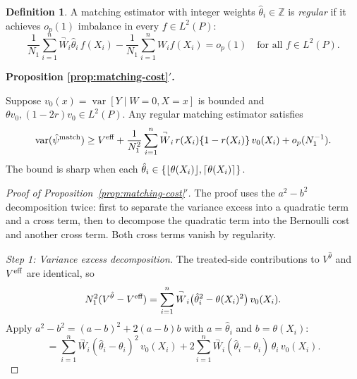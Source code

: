 \documentclass{article}
\newcommand{\paragraph}[1]{\par\noindent\textit{#1}\enspace}
\newenvironment{propositionprime}[1]{%
  \par\medskip\noindent\textbf{Proposition #1$'$.}\itshape\space
}{%
  \par\medskip
}
\theoremstyle{definition}
\newtheorem{definition}{Definition}
\DeclareMathOperator{\Var}{var}
\DeclarePairedDelimiter\floor{\lfloor}{\rfloor}
\DeclarePairedDelimiter\ceil{\lceil}{\rceil}
\newcommand{\<}{\langle}
\renewcommand{\>}{\rangle}
\begin{document}
\begin{refsection}
\begin{definition}
\label{def:regular-matching}
A matching estimator with integer weights $\hat\theta_i \in \mathbb{Z}$ is \emph{regular} if it achieves $o_p(1)$ imbalance in every $f \in L^2(P)$:
\[
\frac{1}{N_1}\sum_{i=1}^n \overset{\neg}{W}_i \hat\theta_i\,f(X_i) - \frac{1}{N_1}\sum_{i=1}^n W_i f(X_i) = o_p(1) \quad \text{for all } f \in L^2(P).
\]
\end{definition}

\begin{propositionprime}{\ref{prop:matching-cost}}
Suppose $v_0(x) = \Var[Y \mid W=0, X=x]$ is bounded and $\theta v_0, (1{-}2r)v_0 \in L^2(P)$. Any regular matching estimator satisfies
\begin{equation}
\label{eq:integer-variance}
\Var(\hat\psi^{\textup{match}}) \ge V^{\textup{eff}} + \frac{1}{N_1^2}\sum_{i=1}^n \overset{\neg}{W}_i\, r(X_i)\{1 - r(X_i)\}\,v_0(X_i) + o_p(N_1^{-1}).
\end{equation}
The bound is sharp when each $\hat\theta_i \in \{\floor{\theta(X_i)}, \ceil{\theta(X_i)}\}$.
\end{propositionprime}

\begin{proof}[Proof of Proposition~\ref{prop:matching-cost}$'$]
The proof uses the $a^2 - b^2$ decomposition twice: first to separate the variance excess into a quadratic term and a cross term, then to decompose the quadratic term into the Bernoulli cost and another cross term. Both cross terms vanish by regularity.

\paragraph{Step 1: Variance excess decomposition.}
The treated-side contributions to $V^{\hat\theta}$ and $V^{\textup{eff}}$ are identical, so
\[
N_1^2(V^{\hat\theta} - V^{\textup{eff}}) = \sum_{i=1}^n \overset{\neg}{W}_i\bigl(\hat\theta_i^2 - \theta(X_i)^2\bigr)\,v_0(X_i).
\]
Apply $a^2 - b^2 = (a{-}b)^2 + 2(a{-}b)b$ with $a = \hat\theta_i$ and $b = \theta(X_i)$:
\begin{equation}
\label{eq:variance-decomp-1}
= \sum_{i=1}^n \overset{\neg}{W}_i(\hat\theta_i - \theta_i)^2\,v_0(X_i) + 2\sum_{i=1}^n \overset{\neg}{W}_i(\hat\theta_i - \theta_i)\,\theta_i\,v_0(X_i).
\end{equation}


\end{proof}
\end{refsection}
\end{document}
